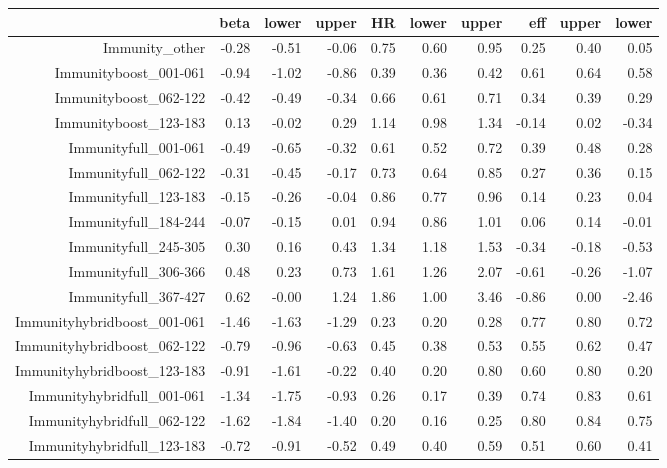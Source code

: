 \begin{table}[ht]
\centering
\begin{tabular}{rrrrrrrrrr}
  \hline
 & beta & lower & upper & HR & lower & upper & eff & upper & lower \\ 
  \hline
Immunity\_other & -0.28 & -0.51 & -0.06 & 0.75 & 0.60 & 0.95 & 0.25 & 0.40 & 0.05 \\ 
  Immunityboost\_001-061 & -0.94 & -1.02 & -0.86 & 0.39 & 0.36 & 0.42 & 0.61 & 0.64 & 0.58 \\ 
  Immunityboost\_062-122 & -0.42 & -0.49 & -0.34 & 0.66 & 0.61 & 0.71 & 0.34 & 0.39 & 0.29 \\ 
  Immunityboost\_123-183 & 0.13 & -0.02 & 0.29 & 1.14 & 0.98 & 1.34 & -0.14 & 0.02 & -0.34 \\ 
  Immunityfull\_001-061 & -0.49 & -0.65 & -0.32 & 0.61 & 0.52 & 0.72 & 0.39 & 0.48 & 0.28 \\ 
  Immunityfull\_062-122 & -0.31 & -0.45 & -0.17 & 0.73 & 0.64 & 0.85 & 0.27 & 0.36 & 0.15 \\ 
  Immunityfull\_123-183 & -0.15 & -0.26 & -0.04 & 0.86 & 0.77 & 0.96 & 0.14 & 0.23 & 0.04 \\ 
  Immunityfull\_184-244 & -0.07 & -0.15 & 0.01 & 0.94 & 0.86 & 1.01 & 0.06 & 0.14 & -0.01 \\ 
  Immunityfull\_245-305 & 0.30 & 0.16 & 0.43 & 1.34 & 1.18 & 1.53 & -0.34 & -0.18 & -0.53 \\ 
  Immunityfull\_306-366 & 0.48 & 0.23 & 0.73 & 1.61 & 1.26 & 2.07 & -0.61 & -0.26 & -1.07 \\ 
  Immunityfull\_367-427 & 0.62 & -0.00 & 1.24 & 1.86 & 1.00 & 3.46 & -0.86 & 0.00 & -2.46 \\ 
  Immunityhybridboost\_001-061 & -1.46 & -1.63 & -1.29 & 0.23 & 0.20 & 0.28 & 0.77 & 0.80 & 0.72 \\ 
  Immunityhybridboost\_062-122 & -0.79 & -0.96 & -0.63 & 0.45 & 0.38 & 0.53 & 0.55 & 0.62 & 0.47 \\ 
  Immunityhybridboost\_123-183 & -0.91 & -1.61 & -0.22 & 0.40 & 0.20 & 0.80 & 0.60 & 0.80 & 0.20 \\ 
  Immunityhybridfull\_001-061 & -1.34 & -1.75 & -0.93 & 0.26 & 0.17 & 0.39 & 0.74 & 0.83 & 0.61 \\ 
  Immunityhybridfull\_062-122 & -1.62 & -1.84 & -1.40 & 0.20 & 0.16 & 0.25 & 0.80 & 0.84 & 0.75 \\ 
  Immunityhybridfull\_123-183 & -0.72 & -0.91 & -0.52 & 0.49 & 0.40 & 0.59 & 0.51 & 0.60 & 0.41 \\ 

\end{tabular}
\end{table}
